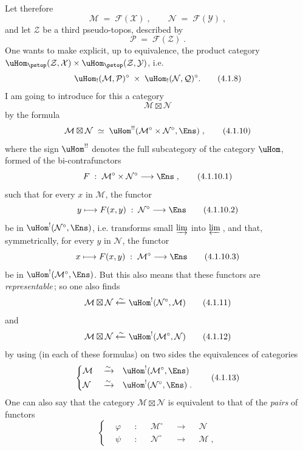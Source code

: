 Let therefore
\[
\mathcal{M} \;=\; \mathcal{F}(\mathcal{X})\;, \qquad \mathcal{N} \;=\; \mathcal{F}(\mathcal{Y})\;,
\tag*{(4.1.6)}
\]
and let $\mathcal{Z}$ be a third pseudo-topos, described by
\[
\mathcal{P} \;=\; \mathcal{F}(\mathcal{Z})\;.
\tag*{(4.1.7)}
\]
One wants to make explicit, up to equivalence, the product category $\uHom_{\pstop}(\mathcal{Z},\mathcal{X})\times\uHom_{\pstop}(\mathcal{Z},\mathcal{Y})$, i.e.
\[
\uHom_!(\mathcal{M},\mathcal{P})^\circ \;\times\; \uHom_!(\mathcal{N},\mathcal{Q})^\circ.
\tag*{(4.1.8)}
\] %
I am going to introduce for this a category
\[
\mathcal{M}\boxtimes\mathcal{N}
\tag*{(4.1.9)}
\]
by the formula
\[
\mathcal{M}\boxtimes\mathcal{N} \;\simeq\; \uHom^{!!}(\mathcal{M}^\circ\times\mathcal{N}^\circ,\Ens)\;,
\tag*{(4.1.10)}
\]
where the sign $\uHom^{!!}$ denotes the full subcategory of the category $\uHom$, formed of the bi-contrafunctors %
\[
F \;:\; \mathcal{M}^\circ\times\mathcal{N}^\circ \longrightarrow \Ens\;,
\tag*{(4.1.10.1)}
\]
such that for every $x$ in $\mathcal{M}$, the functor
\[
y \longmapsto F(x,y) \;:\; \mathcal{N}^\circ \longrightarrow \Ens
\tag*{(4.1.10.2)}
\]
be in $\uHom^!(\mathcal{N}^\circ,\Ens)$, i.e. transforms small $\varinjlim$ into $\varprojlim$\,, and that, symmetrically, for every $y$ in $\mathcal{N}$, the functor
\[
x \longmapsto F(x,y) \;:\; \mathcal{M}^\circ \longrightarrow \Ens
\tag*{(4.1.10.3)}
\]
be in $\uHom^!(\mathcal{M}^\circ,\Ens)$. But this also means that these functors are \textit{representable}\,; so one also finds
\[
\mathcal{M}\boxtimes\mathcal{N} \xleftarrow{\sim} \uHom^!(\mathcal{N}^\circ,\mathcal{M})
\tag*{(4.1.11)}
\]
and
\[
\mathcal{M}\boxtimes\mathcal{N} \xleftarrow{\sim} \uHom^!(\mathcal{M}^\circ,\mathcal{N})
\tag*{(4.1.12)}
\]
by using (in each of these formulas) on two sides the equivalences of categories
\[
\left\{
\begin{aligned}
&\mathcal{M} &&\xrightarrow{\sim} &&\uHom^!(\mathcal{M}^\circ,\Ens)\\
&\mathcal{N} &&\xrightarrow{\sim} &&\uHom^!(\mathcal{N}^\circ,\Ens)\;.
\end{aligned}
\right.
\tag*{(4.1.13)}
\]
One can also say that the category $\mathcal{M}\boxtimes\mathcal{N}$ is equivalent to that of the \textit{pairs} of functors
\[
\left\{
\begin{aligned}
&\varphi &&: &&\mathcal{M}^\circ &&\longrightarrow &&\mathcal{N}\\
&\psi &&: &&\mathcal{N}^\circ &&\longrightarrow &&\mathcal{M}\;,
\end{aligned}
\right.
\tag*{(4.1.14)}
\]
